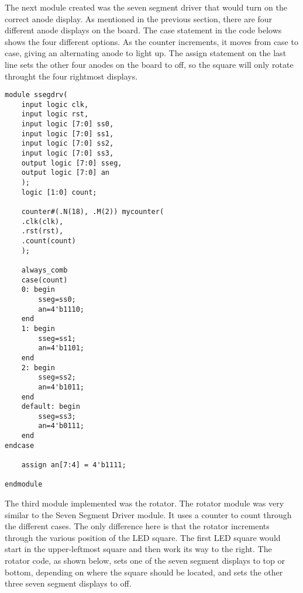 \documentclass[11pt]{article}
\begin{document}
The next module created was the seven segment driver that would turn on the correct anode display. As mentioned in the previous section, there are four different anode displays on the board. The case statement in the code belows shows the four different options. As the counter increments, it moves from case to case, giving an alternating anode to light up. The assign statement on the last line sets the other four anodes on the board to off, so the square will only rotate throught the four rightmost displays. 

\begin{lstlisting}[style=Verilog,caption=Seven Segment Driver Module ,label=code:ex ]
module ssegdrv(
    input logic clk,
    input logic rst,
    input logic [7:0] ss0,
    input logic [7:0] ss1,
    input logic [7:0] ss2,
    input logic [7:0] ss3,
    output logic [7:0] sseg,
    output logic [7:0] an
    );
    logic [1:0] count;
    
    counter#(.N(18), .M(2)) mycounter(
    .clk(clk),
    .rst(rst),
    .count(count)
    );
    
    always_comb 
    case(count)
    0: begin
        sseg=ss0;
        an=4'b1110;
    end 
    1: begin
        sseg=ss1;
        an=4'b1101;
    end 
    2: begin
        sseg=ss2;
        an=4'b1011;
    end 
    default: begin
        sseg=ss3;
        an=4'b0111;
    end
endcase

    assign an[7:4] = 4'b1111;

endmodule
\end{lstlisting}

The third module implemented was the rotator. The rotator module was very similar to the Seven Segment Driver module. It uses a counter to count through the different cases. The only difference here is that the rotator increments through the various position of the LED square. The first LED square would start in the upper-leftmost square and then work its way to the right. The rotator code, as shown below, sets one of the seven segment displays to top or bottom, depending on where the square should be located, and sets the other three seven segment displays to off. 
\end{document}
